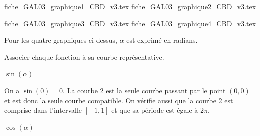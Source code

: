 \hauteurLargeurCadreReponse		{8mm}{3cm}
\initialisationEntrainement


\def\ratioGraphiqueX{1.15}
\def\ratioGraphiqueY{0.7}

\minusMedskip

\begin{center}
{fiche_GAL03_graphique1_CBD_v3.tex}
{fiche_GAL03_graphique2_CBD_v3.tex}
\bigskip

{fiche_GAL03_graphique3_CBD_v3.tex}
{fiche_GAL03_graphique4_CBD_v3.tex}
\end{center}
Pour les quatre graphiques ci-dessus, $\alpha$ est exprimé en radians. 

Associer chaque fonction à sa courbe représentative.


\debutEntrainement


\begin{enonce}
$\sin(\alpha)$
\end{enonce}


\begin{corrige}
On a $\sin(0)=0$. La courbe 2 est la seule courbe passant par le point $(0,0)$ et est donc la seule courbe compatible. On vérifie aussi que la courbe 2 est comprise dans l'intervalle $[-1,1]$ et que sa période est égale à $2\pi$.
\end{corrige}




\begin{enonce}
$\cos(\alpha)$
\end{enonce}

